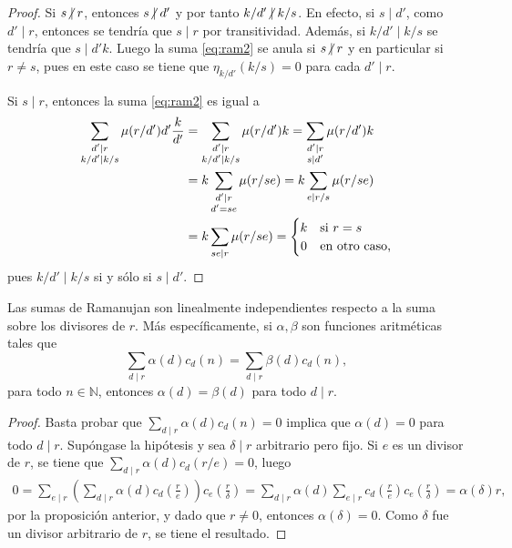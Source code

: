 \begin{proof}
Si $s \centernot\mid r$, entonces $s \centernot\mid d'$ y por tanto $k/d' \centernot\mid k/s$. En efecto, si $s \mid d'$, como $d' \mid r$, entonces se tendría que $s \mid r$ por transitividad. Además, si $k/d' \mid k/s$ se tendría que $s \mid d'k$. Luego la suma \eqref{eq:ram2} se anula si $s \centernot\mid r$ y en particular si $r \ne s$, pues en este caso se tiene que $\eta_{k/d'}(k/s)=0$ para cada $d' \mid r$. 
\bigskip

Si $s \mid r$, entonces la suma \eqref{eq:ram2} es igual a
\begin{equation*}
\begin{split}
    \sum_{\substack{d' \mid r \\ k/d' \mid k/s}} \mu(r/d') d' \frac{k}{d'} &= \sum_{\substack{d' \mid r \\ k/d' \mid k/s}} \mu(r/d') k = \sum_{\substack{d' \mid r \\ s \mid d'}} \mu(r/d') k \\
    &= k \sum_{\substack{d' \mid r \\ d'=se}} \mu(r/se) = k \sum_{e \mid r/s} \mu(r/se) \\
    &= k \sum_{se \mid r} \mu(r/se) = \begin{cases}
        \hfil k & \text{si } r=s \\
        \hfil 0 & \text{en otro caso,}
    \end{cases}
\end{split}
\end{equation*}
pues $k/d' \mid k/s$ si y sólo si $s \mid d'$.
\end{proof}

\begin{corollary}\label{cor:ind}
Las sumas de Ramanujan son linealmente independientes respecto a la suma sobre los divisores de $r$. Más específicamente, si $\alpha, \beta$ son funciones aritméticas tales que
\begin{equation*}
    \sum_{d \mid r} \alpha(d) c_d(n) = \sum_{d \mid r} \beta(d) c_d(n),
\end{equation*}
para todo $n \in \mathbb{N}$, entonces $\alpha(d)=\beta(d)$ para todo $d \mid r$.
\end{corollary}
\begin{proof}
Basta probar que $\sum_{d \mid r} \alpha(d) c_d(n)=0$ implica que $\alpha(d)=0$ para todo $d \mid r$. Supóngase la hipótesis y sea $\delta \mid r$ arbitrario pero fijo. Si $e$ es un divisor de $r$, se tiene que $\sum_{d \mid r} \alpha(d) c_d(r/e)=0$, luego
\begin{align*}
    0 = \sum_{e \mid r} \left( \sum_{d \mid r} \alpha(d) c_d \left( \frac{r}{e} \right) \right) c_e \left( \frac{r}{\delta} \right)= \sum_{d \mid r} \alpha(d) \sum_{e \mid r} c_d \left( \frac{r}{e} \right) c_e \left( \frac{r}{\delta} \right) = \alpha(\delta) r,
\end{align*}
por la proposición anterior, y dado que $r \ne 0$, entonces $\alpha(\delta)=0$. Como $\delta$ fue un divisor arbitrario de $r$, se tiene el resultado.
\end{proof}

